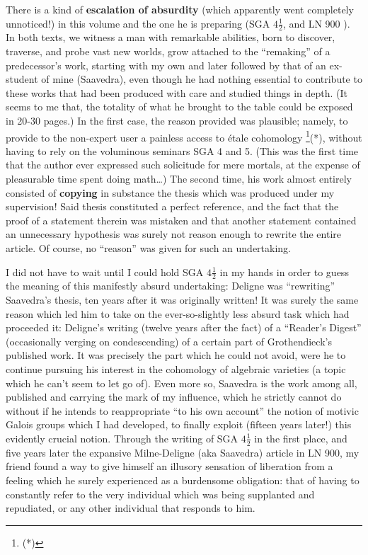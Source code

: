 There is a kind of \textbf{escalation of absurdity}
(which apparently went completely unnoticed!)
in this volume and the one he is preparing
(SGA $4\frac{1}{2}$, and LN 900
). 
In both texts, we witness a man with remarkable abilities, born to discover, traverse, and
probe vast new worlds, grow attached to the ``remaking'' of a predecessor's work,
starting with my own and later followed by that of an ex-student of mine (Saavedra), even
though he had nothing essential to contribute to these works that had been produced with
care and studied things in depth.
(It seems to me that, the totality of what he brought to the table could 
be exposed in 20-30 pages.)
In the first case, the reason provided was plausible; namely, to provide to the non-expert
user a painless access to \'etale cohomology
\footnote{(*)}(*), without having to rely on the voluminous seminars SGA 4 and 5.
(This was the first time that the author ever expressed such solicitude for mere mortals, 
at the expense of pleasurable time spent doing math\ldots)
The second time, his work almost entirely consisted of \textbf{copying} in substance the 
thesis which was produced under my supervision!
Said thesis constituted a perfect reference, and the fact that the proof of a statement
therein was mistaken and that another statement contained an unnecessary hypothesis was
surely not reason enough to rewrite the entire article. 
Of course, no ``reason'' was given for such an undertaking. 

I did not have to wait until I could hold SGA $4\frac{1}{2}$ in my hands in order to guess
the meaning of this manifestly absurd undertaking: Deligne was ``rewriting'' 
Saavedra's thesis, ten years after it was originally written!
It was surely the same reason which led him to take on the ever-so-slightly less absurd
task which had proceeded it: Deligne's writing (twelve years after the fact) of a
``Reader's Digest''
(occasionally verging on condescending) of a certain part of Grothendieck's published
work. It was precisely the part which he could not avoid, were he to continue pursuing his
interest in the cohomology of algebraic varieties (a topic which he can't seem to let go
of). 
Even more so, Saavedra is the work among all, published and carrying the mark of my
influence, which he strictly cannot do without if he intends to reappropriate 
``to his own account'' the notion of motivic Galois groups
which I had developed, to finally exploit (fifteen years later!) this evidently crucial
notion. Through the writing of SGA $4\frac{1}{2}$ in the first place, and five years later
the expansive Milne-Deligne (aka Saavedra) article in LN 900, my friend found a way 
to give himself an illusory sensation of liberation from a feeling which he surely
experienced as a burdensome obligation: that of having to constantly refer to the very
individual which was being supplanted and repudiated, or any other individual that
responds to him. 

